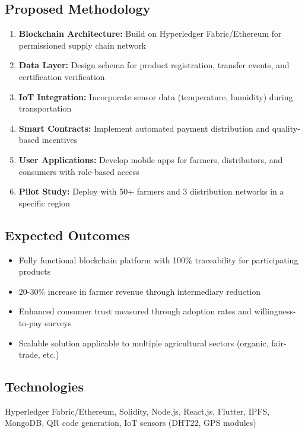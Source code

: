 \documentclass[12pt,a4paper]{article}
\begin{document}
\subsection{Proposed Methodology}
\begin{enumerate}[leftmargin=*]
    \item \textbf{Blockchain Architecture:} Build on Hyperledger Fabric/Ethereum for permissioned supply chain network
    \item \textbf{Data Layer:} Design schema for product registration, transfer events, and certification verification
    \item \textbf{IoT Integration:} Incorporate sensor data (temperature, humidity) during transportation
    \item \textbf{Smart Contracts:} Implement automated payment distribution and quality-based incentives
    \item \textbf{User Applications:} Develop mobile apps for farmers, distributors, and consumers with role-based access
    \item \textbf{Pilot Study:} Deploy with 50+ farmers and 3 distribution networks in a specific region
\end{enumerate}

\subsection{Expected Outcomes}
\begin{itemize}[leftmargin=*]
    \item Fully functional blockchain platform with 100\% traceability for participating products
    \item 20-30\% increase in farmer revenue through intermediary reduction
    \item Enhanced consumer trust measured through adoption rates and willingness-to-pay surveys
    \item Scalable solution applicable to multiple agricultural sectors (organic, fair-trade, etc.)
\end{itemize}

\subsection{Technologies}
Hyperledger Fabric/Ethereum, Solidity, Node.js, React.js, Flutter, IPFS, MongoDB, QR code generation, IoT sensors (DHT22, GPS modules)

\newpage

\end{document}
